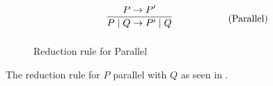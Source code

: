 
\begin{figure}[!h]
    \begin{align}
        & \infrule{P\ra P'}{P\para Q\ra P'\para Q} \tag{Parallel}
    \end{align}
    \caption{Reduction rule for Parallel}
    \label{fig:para}
\end{figure}
\noindent
The reduction rule for $P$ parallel with $Q$ as seen in .
\FloatBarrier

